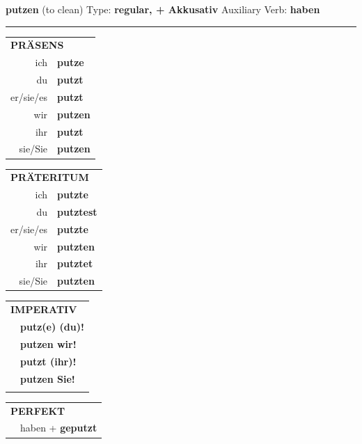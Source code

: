 \documentclass[10pt,a4paper]{revtex4-2}
\begin{document}
\begin{verbbox-acc}
    {\Large \bf putzen} (to clean) \hfill Type: \textbf{regular, + Akkusativ} \hfill Auxiliary Verb: \textbf{haben} 
    
     \vspace{5pt}

    \hrule
    
    \vspace{5pt}

  \begin{tabular}{rl}
     \multicolumn{2}{l}{\textbf{PRÄSENS} }\\
    ich & \textbf{putze}\\
    du & \textbf{putzt}\\
    er/sie/es & \textbf{putzt}\\
    wir & \textbf{putzen}\\
    ihr & \textbf{putzt}\\
    sie/Sie & \textbf{putzen}\\
  \end{tabular}
  \hfill
     \begin{tabular}{rl}
    \multicolumn{2}{l}{\textbf{PRÄTERITUM} }\\
    ich & \textbf{putzte}\\
    du & \textbf{putztest}\\
    er/sie/es & \textbf{putzte}\\
    wir & \textbf{putzten}\\
    ihr & \textbf{putztet}\\
    sie/Sie & \textbf{putzten}\\
  \end{tabular}
  \hfill
  \begin{tabular}{rl}
     \multicolumn{2}{l}{\textbf{IMPERATIV} }\\
   & \textbf{putz(e) (du)!}\\
   & \textbf{putzen wir!}\\
   & \textbf{putzt (ihr)!}\\
   & \textbf{putzen Sie!}\\
   & \vspace{10pt}
  \end{tabular}

    \vspace{10pt}

 \begin{tabular}{rl}
     \multicolumn{2}{l}{\textbf{PERFEKT}}\\
 &  haben + \textbf{geputzt}\\
  \end{tabular}
\hfill
   \begin{tabular}{rl}
   

\end{tabular}
\end{verbbox-acc}
\end{document}

